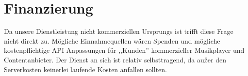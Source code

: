 
\chapter{Finanzierung}
Da unsere Dienstleistung nicht kommerziellen Ursprungs ist trifft diese Frage
nicht direkt zu. Mögliche Einnahmequellen wären Spenden und mögliche kostenpflichtige API
Anpassungen für ,,Kunden'' kommerzieller Musikplayer und Contentanbieter.
Der Dienst an sich ist relativ selbsttragend, da außer den Serverkosten
keinerlei laufende Kosten anfallen sollten.
